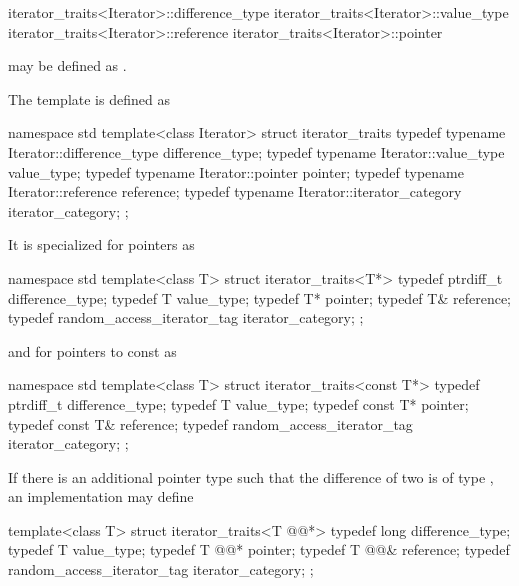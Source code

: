 \begin{codeblock}
iterator_traits<Iterator>::difference_type
iterator_traits<Iterator>::value_type
iterator_traits<Iterator>::reference
iterator_traits<Iterator>::pointer
\end{codeblock}

may be defined as .

\pnum
The template
is defined as

\begin{codeblock}
namespace std {
  template<class Iterator> struct iterator_traits {
    typedef typename Iterator::difference_type difference_type;
    typedef typename Iterator::value_type value_type;
    typedef typename Iterator::pointer pointer;
    typedef typename Iterator::reference reference;
    typedef typename Iterator::iterator_category iterator_category;
  };
}
\end{codeblock}

\pnum
It is specialized for pointers as

\begin{codeblock}
namespace std {
  template<class T> struct iterator_traits<T*> {
    typedef ptrdiff_t difference_type;
    typedef T value_type;
    typedef T* pointer;
    typedef T& reference;
    typedef random_access_iterator_tag iterator_category;
  };
}
\end{codeblock}

and for pointers to const as

\begin{codeblock}
namespace std {
  template<class T> struct iterator_traits<const T*> {
    typedef ptrdiff_t difference_type;
    typedef T value_type;
    typedef const T* pointer;
    typedef const T& reference;
    typedef random_access_iterator_tag iterator_category;
  };
}
\end{codeblock}

\pnum
\enternote
If there is an additional pointer type
such that the difference of two
is of type
,
an implementation may define

\begin{codeblock}
  template<class T> struct iterator_traits<T @@*> {
    typedef long difference_type;
    typedef T value_type;
    typedef T @@* pointer;
    typedef T @@& reference;
    typedef random_access_iterator_tag iterator_category;
  };
\end{codeblock}
\exitnote

